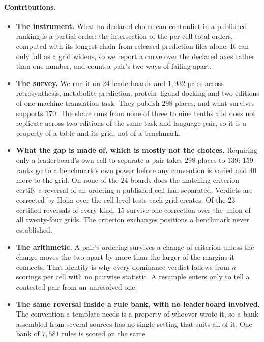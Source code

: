 \documentclass{article}
\newcommand{\nbank}{7{,}581}          %
\begin{document}
\paragraph{Contributions.}
\begin{itemize}\itemsep2pt \parskip0pt
\item \textbf{The instrument.} What no declared choice can contradict in a published ranking is a
  partial order: the intersection of the per-cell total orders, computed with its longest chain from
  released prediction files alone. It can only fall as a grid widens, so we report a curve over the
  declared axes rather than one number, and count a pair's two ways of failing apart.
\item \textbf{The survey.} We run it on $24$ leaderboards and $1{,}932$ pairs across
  retrosynthesis, metabolite prediction, protein--ligand docking and two editions of one machine
  translation task. They publish $298$ places, and what survives supports $170$. The share runs from none
  of three to nine tenths and does not replicate across two editions of the same task and language
  pair, so it is a property of a table and its grid, not of a benchmark.
\item \textbf{What the gap is made of, which is mostly not the choices.} Requiring only a
  leaderboard's own cell to separate a pair takes $298$ places to $139$: $159$ ranks go to a
  benchmark's own power before any convention is varied and $40$ more to the grid. On none of the $24$
  boards does the matching criterion certify a reversal of an ordering a published cell had
  separated. Verdicts are corrected by Holm over the cell-level tests each grid creates. Of the $23$
  certified reversals of every kind, $15$ survive one correction over the union of all twenty-four
  grids. The criterion exchanges positions a benchmark never established.
\item \textbf{The arithmetic.} A pair's ordering survives a change of criterion unless the change
  moves the two apart by more than the larger of the margins it connects. That identity is why every
  dominance verdict follows from $n$ scorings per cell with no pairwise statistic. A resample enters
  only to tell a contested pair from an unresolved one.
\item \textbf{The same reversal inside a rule bank, with no leaderboard involved.} The convention
  a template needs is a property of whoever wrote it, so a bank assembled from several sources has
  no single setting that suits all of it. One bank of $\nbank$ rules is scored on the same

\end{itemize}
\end{document}

